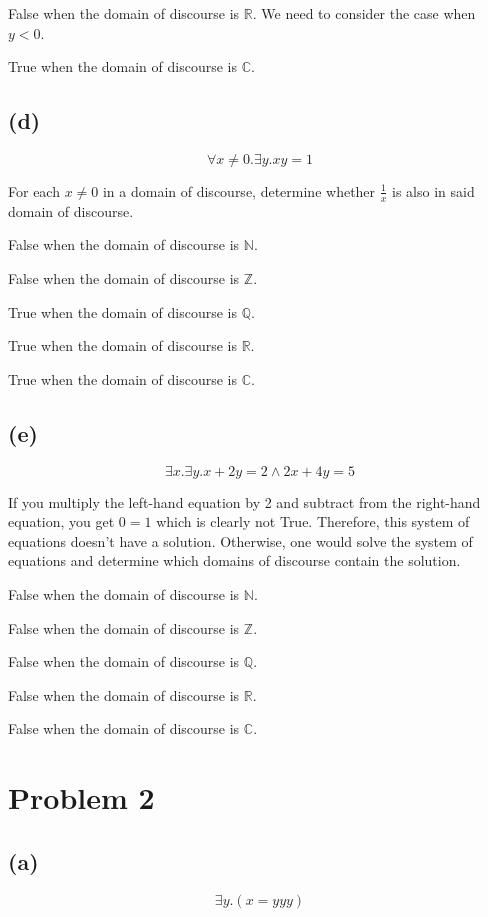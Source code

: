 \documentclass{article}
\begin{document}
False when the domain of discourse is $\mathbb{R}$. We need to consider the case when $y < 0$.

True when the domain of discourse is $\mathbb{C}$.

\subsection{(d)}
\[
	\forall x \ne 0. \exists y.xy = 1
\]

For each $x \ne 0$ in a domain of discourse, determine whether $\frac{1}{x}$ is also in said domain of discourse.

False when the domain of discourse is $\mathbb{N}$.

False when the domain of discourse is $\mathbb{Z}$.

True when the domain of discourse is $\mathbb{Q}$.

True when the domain of discourse is $\mathbb{R}$.

True when the domain of discourse is $\mathbb{C}$.

\subsection{(e)}
\[
	\exists x. \exists y.x + 2y = 2 \land 2x + 4y = 5
\]

If you multiply the left-hand equation by 2 and subtract from the right-hand equation, you get $0 = 1$ which is clearly not True. Therefore, this system of equations doesn't have a solution. Otherwise, one would solve the system of equations and determine which domains of discourse contain the solution.

False when the domain of discourse is $\mathbb{N}$.

False when the domain of discourse is $\mathbb{Z}$.

False when the domain of discourse is $\mathbb{Q}$.

False when the domain of discourse is $\mathbb{R}$.

False when the domain of discourse is $\mathbb{C}$.

\pagebreak

\section{Problem 2}

\subsection{(a)}
\[
	\exists y.(x = yyy)
\]
\end{document}
